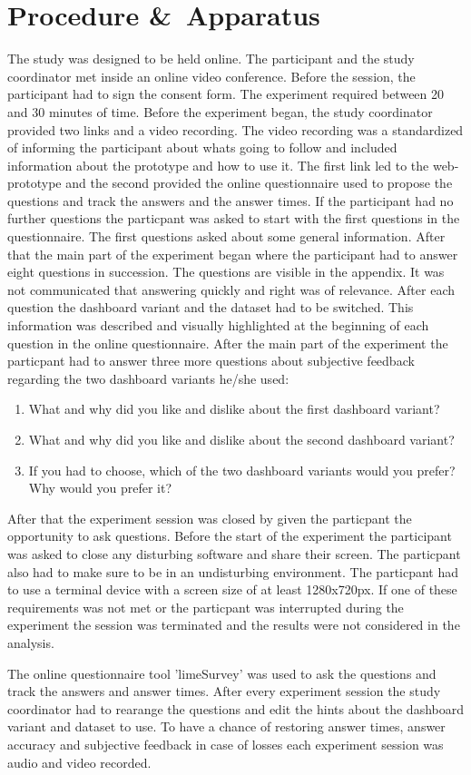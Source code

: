 \section{Procedure \&\ Apparatus}
The study was designed to be held online. The participant and the study coordinator met inside an online video conference. Before the session,
the participant had to sign the consent form. The experiment required between 20 and 30 minutes of time. Before the experiment began, the
study coordinator provided two links and a video recording. The video recording was a standardized of informing the participant about whats
going to follow and included information about the prototype and how to use it. The first link led to the web-prototype and the second
provided the online questionnaire used to propose the questions and track the answers and the answer times. If the participant had no further
questions the particpant was asked to start with the first questions in the questionnaire. The first questions asked about some general
information. After that the main part of the experiment began where the participant had to answer eight questions in succession. The questions
are visible in the appendix.
It was not communicated that answering quickly and right was of relevance. After each question the dashboard variant and the dataset had to
be switched. This information was described and visually highlighted at the beginning of each question in the online questionnaire. After the
main part of the experiment the particpant had to answer three more questions about subjective feedback regarding the two dashboard variants
he/she used:
\begin{enumerate}
    \item What and why did you like and dislike about the first dashboard variant?
    \item What and why did you like and dislike about the second dashboard variant?
    \item If you had to choose, which of the two dashboard variants would you prefer? Why would you prefer it?
\end{enumerate}
After that the experiment session was closed by given the particpant the opportunity to ask questions. Before the start of the experiment the 
participant was asked to close any disturbing software and share their screen. The particpant also had to make sure to be in an 
undisturbing environment. The particpant had to use a terminal device with a screen size of at least 1280x720px. If one of these requirements
was not met or the particpant was interrupted during the experiment the session was terminated and the results were not considered in the
analysis.

The online questionnaire tool 'limeSurvey' was used to ask the questions and track the answers and answer times. After every experiment session
the study coordinator had to rearange the questions and edit the hints about the dashboard variant and dataset to use. To have a chance of
restoring answer times, answer accuracy and subjective feedback in case of losses each experiment session was audio and video recorded.